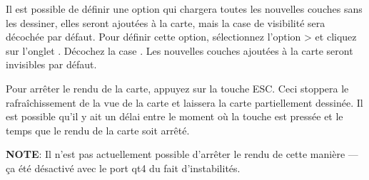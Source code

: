 %

\label{label_settinglayer}

Il est possible de définir une option qui chargera toutes les nouvelles couches sans les dessiner, elles seront ajoutées à la carte, mais la case de visibilité sera décochée par défaut. Pour définir cette option, sélectionnez l'option  >  et cliquez sur l'onglet . Décochez la case . Les nouvelles couches ajoutées à la carte seront invisibles par défaut.


\label{label_stoprender}

Pour arrêter le rendu de la carte, appuyez sur la touche ESC. Ceci stoppera le rafraîchissement de la vue de la carte et laissera la carte partiellement dessinée. Il est possible qu'il y ait un délai entre le moment où la touche est pressée et le temps que le rendu de la carte soit arrêté.

\textbf{NOTE}: Il n'est pas actuellement possible d'arrêter le rendu de cette manière — ça été désactivé avec le port qt4 du fait d'instabilités.

%

